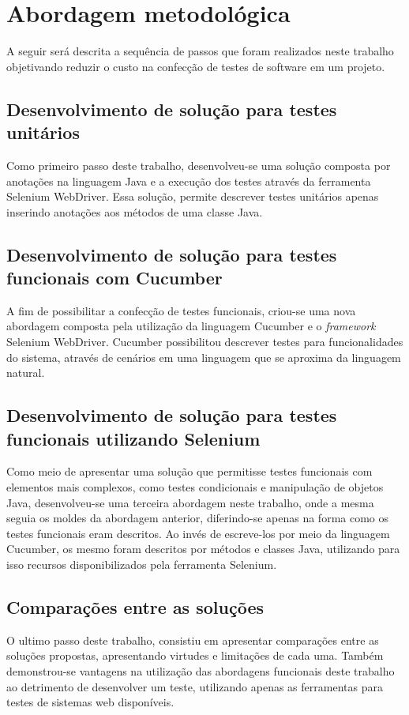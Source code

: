 \documentclass[tg]{mdtufsm}
\begin{document}
\section{Abordagem metodológica}
A seguir será descrita a sequência de passos que foram realizados neste trabalho
objetivando reduzir o custo na confecção de testes de software em um projeto.

\subsection{Desenvolvimento de solução para testes unitários}
Como primeiro passo deste trabalho, desenvolveu-se uma solução composta por anotações na linguagem Java e a execução dos testes através da ferramenta Selenium WebDriver.
Essa solução, permite descrever testes unitários apenas inserindo anotações aos métodos de uma classe Java.

\subsection{Desenvolvimento de solução para testes funcionais com Cucumber}
A fim de possibilitar a confecção de testes funcionais, criou-se uma nova abordagem composta pela utilização da linguagem Cucumber e o \emph{framework} Selenium WebDriver.
Cucumber possibilitou descrever testes para funcionalidades do sistema, através de cenários em uma linguagem que se aproxima da linguagem natural.

\subsection{Desenvolvimento de solução para testes funcionais utilizando Selenium}
Como meio de apresentar uma solução que permitisse testes funcionais com elementos mais complexos, como testes condicionais e manipulação de objetos Java, desenvolveu-se
uma terceira abordagem neste trabalho, onde a mesma seguia os moldes da abordagem anterior, diferindo-se apenas na forma como os testes funcionais eram descritos. Ao invés de
escreve-los por meio da linguagem Cucumber, os mesmo foram descritos por métodos e classes Java, utilizando para isso recursos disponibilizados pela ferramenta Selenium.

\subsection{Comparações entre as soluções}
O ultimo passo deste trabalho, consistiu em apresentar comparações entre as soluções propostas, apresentando virtudes e limitações de cada uma. Também demonstrou-se
vantagens na utilização das abordagens funcionais deste trabalho ao detrimento de desenvolver um teste, utilizando apenas as ferramentas para testes de sistemas web disponíveis.
\end{document}
